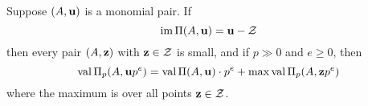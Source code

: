 \documentclass[11pt]{amsart}
\begin{document}


\begin{proposition}
Suppose $(A, \mathbf{u})$ is a monomial pair.  If \[ \operatorname{im} \Pi(A, \mathbf{u}) = \mathbf{u} - \mathcal{Z}\] then every pair $(A, \mathbf{z})$ with $\mathbf{z} \in \mathcal{Z}$ is small, and if $p \gg 0$ and $e \geq 0$, then 
\[ \operatorname{val} \Pi_p(A, \mathbf{u} p^e) = \operatorname{val} \Pi(A, \mathbf{u}) \cdot p^e + \max \operatorname{val} \Pi_p(A, \mathbf{z}p^e) \]
where the maximum is over all points $\mathbf{z} \in \mathcal{Z}$.
\end{proposition}

\end{document}
